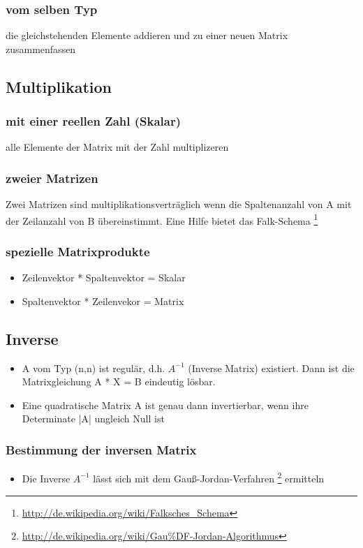 \documentclass[a4paper,12pt]{scrartcl}
\begin{document}
\subsubsection{vom selben Typ}
die gleichstehenden Elemente addieren und zu einer neuen Matrix zusammenfassen

\subsection{Multiplikation}
\subsubsection{mit einer reellen Zahl (Skalar)}
alle Elemente der Matrix mit der Zahl multiplizeren

\subsubsection{zweier Matrizen}
Zwei Matrizen sind multiplikationsverträglich wenn die Spaltenanzahl von A mit der Zeilanzahl von B übereinstimmt. 
Eine Hilfe bietet das Falk-Schema \footnote{\url{http://de.wikipedia.org/wiki/Falksches_Schema}}

\subsubsection{spezielle Matrixprodukte}
\begin{itemize}
\item Zeilenvektor * Spaltenvektor = Skalar
\item Spaltenvektor * Zeilenvekor = Matrix
\end{itemize}


\subsection{Inverse}
\begin{itemize}
\item A vom Typ (n,n) ist regulär, d.h. $A^{-1}$ (Inverse Matrix) existiert. Dann ist die Matrixgleichung A * X = B eindeutig lösbar.
\item Eine quadratische Matrix A ist genau dann invertierbar, wenn ihre Determinate |A| ungleich Null ist
\end{itemize}

\subsubsection{Bestimmung der inversen Matrix}
\begin{itemize}
\item Die Inverse $A^{-1}$ lässt sich mit dem Gauß-Jordan-Verfahren \footnote{\url{http://de.wikipedia.org/wiki/Gau\%DF-Jordan-Algorithmus}} ermitteln
\end{itemize}
\end{document}
